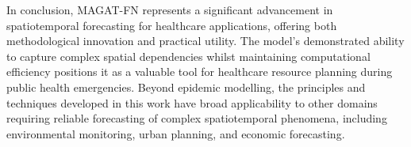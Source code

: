 \documentclass[lettersize, journal]{IEEEtran}
\begin{document}
In conclusion, MAGAT-FN represents a significant advancement in spatiotemporal forecasting for healthcare applications, offering both methodological innovation and practical utility. The model's demonstrated ability to capture complex spatial dependencies whilst maintaining computational efficiency positions it as a valuable tool for healthcare resource planning during public health emergencies. Beyond epidemic modelling, the principles and techniques developed in this work have broad applicability to other domains requiring reliable forecasting of complex spatiotemporal phenomena, including environmental monitoring, urban planning, and economic forecasting.



\end{document}
